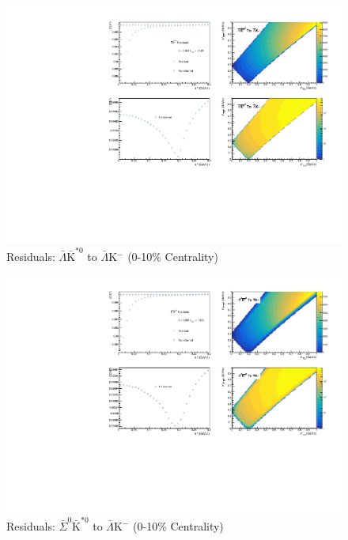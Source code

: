\documentclass[../AnalysisNoteJBuxton.tex]{subfiles}
\begin{document}
\begin{figure}[h]
  \centering
  \includegraphics[width=\textwidth]{9_AdditionalFigures/Figures/Residuals/ALamKchM/Residuals_ALamKchM_0010_ALamAKSt0_MomResCrctn_NonFlatBgdCrctn_10Res_PrimMaxDecay4fm_UsingXiDataAndCoulombOnly.pdf}
  \caption[Residuals: $\bar{\Lambda}\bar{\mathrm{K}}^{*0}$ to $\bar{\Lambda}$K$^{-}$ (0-10\% Centrality)]{Residuals: $\bar{\Lambda}\bar{\mathrm{K}}^{*0}$ to $\bar{\Lambda}$K$^{-}$ (0-10\% Centrality)}
  \label{fig:Res_ALamKchM_0010_ALamAKSt0}
\end{figure}


\begin{figure}[h]
  \centering
  \includegraphics[width=\textwidth]{9_AdditionalFigures/Figures/Residuals/ALamKchM/Residuals_ALamKchM_0010_ASigma0AKSt0_MomResCrctn_NonFlatBgdCrctn_10Res_PrimMaxDecay4fm_UsingXiDataAndCoulombOnly.pdf}
  \caption[Residuals: $\bar{\Sigma}^{0}\bar{\mathrm{K}}^{*0}$ to $\bar{\Lambda}$K$^{-}$ (0-10\% Centrality)]{Residuals: $\bar{\Sigma}^{0}\bar{\mathrm{K}}^{*0}$ to $\bar{\Lambda}$K$^{-}$ (0-10\% Centrality)}
  \label{fig:Res_ALamKchM_0010_ASig0AKSt0}
\end{figure}
\end{document}
